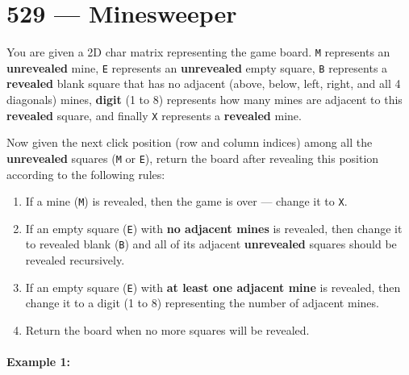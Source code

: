 \section{529 --- Minesweeper}
You are given a 2D char matrix representing the game board. \texttt{M} represents an \textbf{unrevealed} mine, \texttt{E} represents an \textbf{unrevealed} empty square, \texttt{B} represents a \textbf{revealed} blank square that has no adjacent (above, below, left, right, and all 4 diagonals) mines, \textbf{digit} (1 to 8) represents how many mines are adjacent to this \textbf{revealed} square, and finally \texttt{X} represents a \textbf{revealed} mine.

Now given the next click position (row and column indices) among all the \textbf{unrevealed} squares (\texttt{M} or \texttt{E}), return the board after revealing this position according to the following rules:

\begin{enumerate}
\item If a mine (\texttt{M}) is revealed, then the game is over --- change it to \texttt{X}.
\item If an empty square (\texttt{E}) with \textbf{no adjacent mines} is revealed, then change it to revealed blank (\texttt{B}) and all of its adjacent \textbf{unrevealed} squares should be revealed recursively.
\item If an empty square (\texttt{E}) with \textbf{at least one adjacent mine} is revealed, then change it to a digit (1 to 8) representing the number of adjacent mines.
\item Return the board when no more squares will be revealed.
\end{enumerate}
 

\paragraph{Example 1:}

